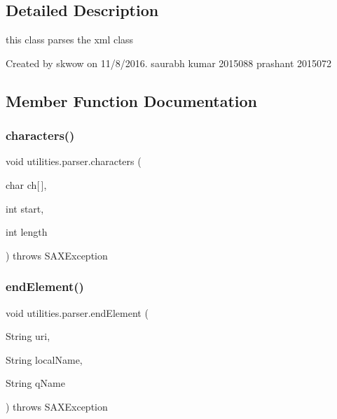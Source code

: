 \subsection{Detailed Description}
this class parses the xml class 

Created by skwow on 11/8/2016. saurabh kumar 2015088 prashant 2015072 

\subsection{Member Function Documentation}
\hypertarget{classutilities_1_1parser_aaf564dc89d2e86903538e014323d1482}{}\label{classutilities_1_1parser_aaf564dc89d2e86903538e014323d1482} 
\subsubsection{\texorpdfstring{characters()}{characters()}}
{\footnotesize\ttfamily void utilities.\+parser.\+characters (\begin{DoxyParamCaption}\item[{char}]{ch\mbox{[}$\,$\mbox{]},  }\item[{int}]{start,  }\item[{int}]{length }\end{DoxyParamCaption}) throws S\+A\+X\+Exception}

\hypertarget{classutilities_1_1parser_a63a7843809987e45e5bb9bb790a1c8ff}{}\label{classutilities_1_1parser_a63a7843809987e45e5bb9bb790a1c8ff} 
\subsubsection{\texorpdfstring{end\+Element()}{endElement()}}
{\footnotesize\ttfamily void utilities.\+parser.\+end\+Element (\begin{DoxyParamCaption}\item[{String}]{uri,  }\item[{String}]{local\+Name,  }\item[{String}]{q\+Name }\end{DoxyParamCaption}) throws S\+A\+X\+Exception}

\hypertarget{classutilities_1_1parser_aca9b03d52069091a9fbe48ca5723a52c}{}\label{classutilities_1_1parser_aca9b03d52069091a9fbe48ca5723a52c} 
